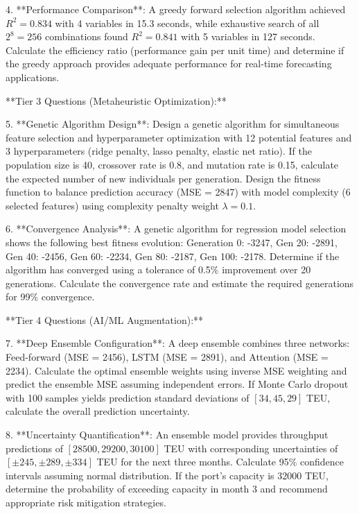 \documentclass{article}
\begin{document}
4. **Performance Comparison**: A greedy forward selection algorithm achieved $R^2 = 0.834$ with 4 variables in 15.3 seconds, while exhaustive search of all $2^8 = 256$ combinations found $R^2 = 0.841$ with 5 variables in 127 seconds. Calculate the efficiency ratio (performance gain per unit time) and determine if the greedy approach provides adequate performance for real-time forecasting applications.

**Tier 3 Questions (Metaheuristic Optimization):**

5. **Genetic Algorithm Design**: Design a genetic algorithm for simultaneous feature selection and hyperparameter optimization with 12 potential features and 3 hyperparameters (ridge penalty, lasso penalty, elastic net ratio). If the population size is 40, crossover rate is 0.8, and mutation rate is 0.15, calculate the expected number of new individuals per generation. Design the fitness function to balance prediction accuracy (MSE = 2847) with model complexity (6 selected features) using complexity penalty weight $\lambda = 0.1$.

6. **Convergence Analysis**: A genetic algorithm for regression model selection shows the following best fitness evolution: Generation 0: -3247, Gen 20: -2891, Gen 40: -2456, Gen 60: -2234, Gen 80: -2187, Gen 100: -2178. Determine if the algorithm has converged using a tolerance of 0.5\% improvement over 20 generations. Calculate the convergence rate and estimate the required generations for 99\% convergence.

**Tier 4 Questions (AI/ML Augmentation):**

7. **Deep Ensemble Configuration**: A deep ensemble combines three networks: Feed-forward (MSE = 2456), LSTM (MSE = 2891), and Attention (MSE = 2234). Calculate the optimal ensemble weights using inverse MSE weighting and predict the ensemble MSE assuming independent errors. If Monte Carlo dropout with 100 samples yields prediction standard deviations of $[34, 45, 29]$ TEU, calculate the overall prediction uncertainty.

8. **Uncertainty Quantification**: An ensemble model provides throughput predictions of $[28500, 29200, 30100]$ TEU with corresponding uncertainties of $[\pm 245, \pm 289, \pm 334]$ TEU for the next three months. Calculate 95\% confidence intervals assuming normal distribution. If the port's capacity is 32000 TEU, determine the probability of exceeding capacity in month 3 and recommend appropriate risk mitigation strategies.
\end{document}
